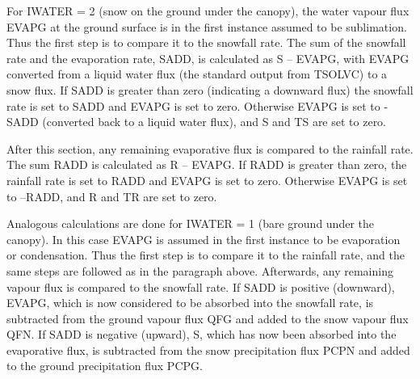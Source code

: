 For I\+W\+A\+T\+E\+R = 2 (snow on the ground under the canopy), the water vapour flux E\+V\+A\+P\+G at the ground surface is in the first instance assumed to be sublimation. Thus the first step is to compare it to the snowfall rate. The sum of the snowfall rate and the evaporation rate, S\+A\+D\+D, is calculated as S – E\+V\+A\+P\+G, with E\+V\+A\+P\+G converted from a liquid water flux (the standard output from T\+S\+O\+L\+V\+C) to a snow flux. If S\+A\+D\+D is greater than zero (indicating a downward flux) the snowfall rate is set to S\+A\+D\+D and E\+V\+A\+P\+G is set to zero. Otherwise E\+V\+A\+P\+G is set to -\/\+S\+A\+D\+D (converted back to a liquid water flux), and S and T\+S are set to zero.

After this section, any remaining evaporative flux is compared to the rainfall rate. The sum R\+A\+D\+D is calculated as R – E\+V\+A\+P\+G. If R\+A\+D\+D is greater than zero, the rainfall rate is set to R\+A\+D\+D and E\+V\+A\+P\+G is set to zero. Otherwise E\+V\+A\+P\+G is set to –\+R\+A\+D\+D, and R and T\+R are set to zero.

Analogous calculations are done for I\+W\+A\+T\+E\+R = 1 (bare ground under the canopy). In this case E\+V\+A\+P\+G is assumed in the first instance to be evaporation or condensation. Thus the first step is to compare it to the rainfall rate, and the same steps are followed as in the paragraph above. Afterwards, any remaining vapour flux is compared to the snowfall rate. If S\+A\+D\+D is positive (downward), E\+V\+A\+P\+G, which is now considered to be absorbed into the snowfall rate, is subtracted from the ground vapour flux Q\+F\+G and added to the snow vapour flux Q\+F\+N. If S\+A\+D\+D is negative (upward), S, which has now been absorbed into the evaporative flux, is subtracted from the snow precipitation flux P\+C\+P\+N and added to the ground precipitation flux P\+C\+P\+G.